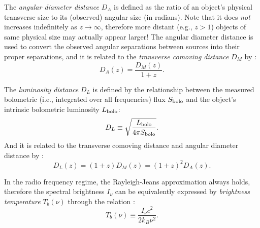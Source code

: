 The \emph{angular diameter distance} $D_A$ is defined as the ratio of
an object's physical transverse size to its (observed) angular size
(in radians).  Note that it does \emph{not} increases indefinitely
as $z \to \infty$, therefore more distant (e.g., $z > 1$)
objects of same physical size may actually appear larger!
The angular diameter distance is used to convert the observed angular
separations between sources into their proper separations, and it is
related to the \emph{transverse comoving distance} $D_M$ by
\cite{weinberg1972,peebles1993,hogg1999}:
\begin{equation}
  \label{eq:da-dm}
  D_A(z) = \frac{D_M(z)}{1 + z}.
\end{equation}

The \emph{luminosity distance} $D_L$ is defined by the relationship
between the measured bolometric (i.e., integrated over all frequencies)
flux $S_{\mathrm{bolo}}$ and the object's intrinsic bolometric luminosity
$L_{\mathrm{bolo}}$:
\begin{equation}
  \label{eq:dl-def}
  D_L \equiv \sqrt{\frac{L_{\mathrm{bolo}}}{4\pi S_{\mathrm{bolo}}}}.
\end{equation}
And it is related to the transverse comoving distance and angular
diameter distance by \cite{weinberg1972,hogg1999,ellis2007}:
\begin{equation}
  \label{eq:dl-dm-da}
  D_L(z) = (1+z) D_M(z) = (1+z)^2 D_A(z).
\end{equation}

In the radio frequency regime, the Rayleigh-Jeans approximation
always holds, therefore the spectral brightness $I_{\nu}$ can be
equivalently expressed by \emph{brightness temperature} $T_b(\nu)$
through the relation \cite{condon2016}:
\begin{equation}
  \label{eq:brightness-temp}
  T_b(\nu) \equiv \frac{I_{\nu} c^2}{2 k_B \nu^2}.
\end{equation}



